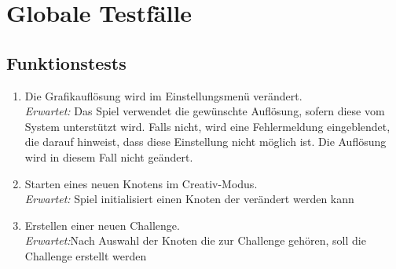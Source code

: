 \chapter{Globale Testfälle}

\renewcommand{\theenumi}{/T\_\arabic{enumi}0/}
\renewcommand{\labelenumi}{\theenumi}

\section{Funktionstests}

\begin{enumerate}
\item Die Grafikauflösung wird im Einstellungsmenü verändert.\\
\textit{Erwartet:} Das Spiel verwendet die gewünschte Auflösung, sofern diese vom System unterstützt wird. Falls nicht, wird eine Fehlermeldung eingeblendet, die darauf hinweist, dass diese Einstellung nicht möglich ist. Die Auflösung wird in diesem Fall nicht geändert.

\item Starten eines neuen Knotens im Creativ-Modus.\\
\textit{Erwartet:} Spiel initialisiert einen Knoten der verändert werden kann

\item Erstellen einer neuen Challenge.\\
\textit{Erwartet:}Nach Auswahl der Knoten die zur Challenge gehören, soll die Challenge erstellt werden
	 	

\end{enumerate}
